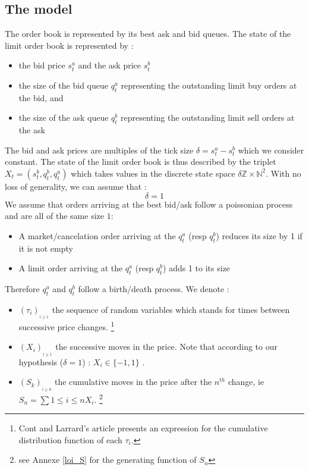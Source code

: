 \documentclass{article}
\begin{document}
\subsection{The model}
The order book is represented by its best ask and bid queues. The state of the limit order book is represented by :
\begin{itemize}
\item the bid price $ s_{t}^{a} $ and the ask price $ s_{t}^{b} $ 
\item the size of the bid queue $ q_{t}^{a} $ representing the outstanding limit buy orders at the bid, and 
\item the size of the ask queue $ q_{t}^{b} $ representing the outstanding limit sell orders at the ask 
\end{itemize}
The bid and ask prices are multiples of the tick size $\delta = s_{t}^{a} - s_{t}^{b}$ which we consider constant.
The state of the limit order book is thus described by the triplet $X_{t} = (s_{t}^{b}, q_{t}^{b}, q_{t}^{a})$ which takes values in the discrete state space $\delta \mathbb{Z} \times \mathbb{N}^{2} $. With no loss of generality, we can assume that  :
\begin{equation}
\delta = 1
\end{equation}
We assume that orders arriving at the best bid/ask follow a poissonian process and are all of the same size $1$:
\begin{itemize}
	\item A market/cancelation order arriving at the $q_t^a$ (resp $q_t^b$) reduces its size by 1 if it is not empty
	\item A limit order arriving at the $q_t^a$ (resp $q_t^b$) adds 1 to its size 
\end{itemize}
Therefore $q_t^a$ and $q_t^b$ follow a birth/death process.
We denote :
\begin{itemize}
\item $(\tau_i)_{_{i \geq 1}}$ the sequence of random variables  which stands for times between successive price changes. \footnote { Cont and Larrard's article presents an expression for the cumulative distribution function of each $\tau_i$. }
\item $(X_i)_{_{i \geq 1}}$ the successive moves in the price. Note that according to our hypothesis ($\delta = 1$) : $X_i \in \{-1,1\}$ .
\item $(S_k)_{_{i \geq 0}}$ the cumulative moves in the price after the $n^{th}$ change, ie $S_n = \sum{1 \leq i \leq n } X_i$. \footnote{ see Annexe \ref{loi_S} for the generating function of $S_n$ }  
\end{itemize}
\end{document}
